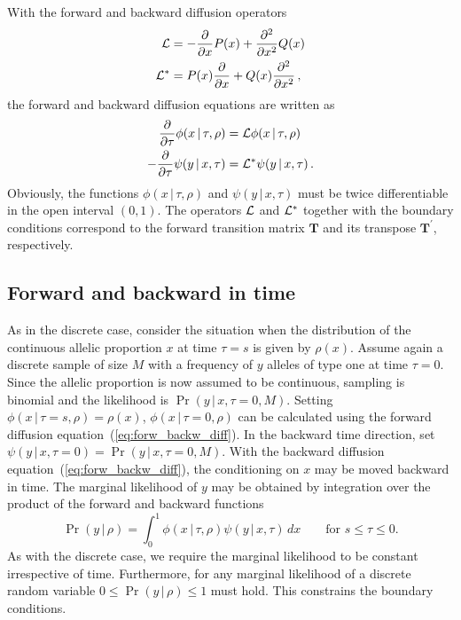\documentclass[preprint]{elsarticle}
\newcommand\given{{\,|\,}}
\newcommand\y{\ensuremath{y}}
\newcommand\s{\ensuremath{s}}
\begin{document}
With the forward and backward diffusion operators 
\begin{equation}\label{eq:forw_backw_operator}
 \begin{split}
     {\cal L}&=-\frac{\partial}{\partial x}P(x)+ \frac{\partial^2}{\partial x^2}Q(x)\\
     {\cal L}^{*}&=P(x)\frac{\partial}{\partial x} +Q(x)\frac{\partial^2}{\partial x^2}\,,
 \end{split}
\end{equation}
the forward and backward diffusion equations are written as
\begin{equation}\label{eq:forw_backw_diff}
\begin{split}
\frac{\partial}{\partial \tau}\phi(x\given\tau,\rho)&={\cal L} \phi(x\given \tau,\rho)\\
-\frac{\partial}{\partial \tau}\psi(\y\given x,\tau)&={\cal L}^{*} \psi(\y\given x, \tau)\,.
\end{split}
\end{equation}
Obviously, the functions $\phi(x\given \tau,\rho)$ and $\psi(\y\given x, \tau)$ must be twice differentiable in the open interval $(0,1)$. The operators ${\cal L}$ and ${\cal L}^{*}$ together with the boundary conditions correspond to the forward transition matrix $\mathbf{T}$ and its transpose $\mathbf{T}^{'}$, respectively. %

\subsection{Forward and backward in time}

As in the discrete case, consider the situation when the distribution of the continuous allelic proportion $x$ at time $\tau=\s$ is given by $\rho(x)$. Assume again a discrete sample of size $M$ with a frequency of $\y$ alleles of type one at time $\tau=0$. Since the allelic proportion is now assumed to be continuous, sampling is binomial and the likelihood is $\Pr(\y\given x,\tau=0,M)$. Setting $\phi(x\given \tau=\s,\rho)=\rho(x)$, $\phi(x\given \tau=0,\rho)$ can be calculated using the forward diffusion equation~(\ref{eq:forw_backw_diff}). In the backward time direction, set  $\psi(\y\given x,\tau=0)=\Pr(\y\given x,\tau=0,M)$. With the backward diffusion equation~(\ref{eq:forw_backw_diff}), the conditioning on $x$ may be moved backward in time. The marginal likelihood of $\y$ may be obtained by integration over the product of the forward and backward functions 
\begin{equation}\label{eq:marg_like}
\Pr(\y\given\rho) = \int_{0}^{1} \phi(x\given \tau,\rho)\psi(\y\given x,\tau)  \,dx \qquad\text{for $s\leq \tau\leq 0$.}
\end{equation}
As with the discrete case, we require the marginal likelihood to be constant irrespective of time. Furthermore, for any marginal likelihood of a discrete random variable $0\leq \Pr(y\given\rho) \leq 1$ must hold. This constrains the boundary conditions. 
\end{document}
